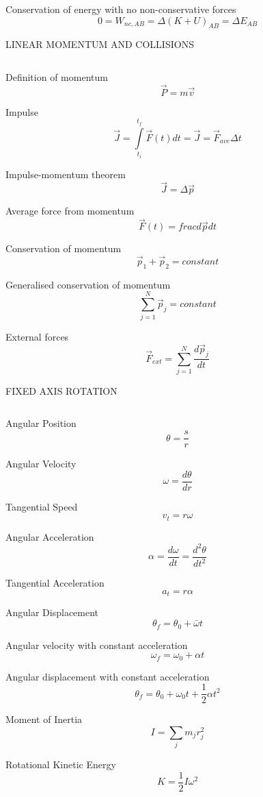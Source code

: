 \documentclass[12pt, letterpaper, twoside]{article}
\begin{document}
Conservation of energy with no non-conservative forces
$$ 0 = W_{nc,AB} = \Delta (K + U)_{AB} = \Delta E_{AB} $$



\newpage

LINEAR MOMENTUM AND COLLISIONS

$$ $$

Definition of momentum
$$ \overrightarrow{P} = m \overrightarrow{v} $$


Impulse
$$ \overrightarrow{J} = \int\limits_{t_i}^{t_f} \overrightarrow{F}(t) dt  = \overrightarrow{J} = \overrightarrow{F}_{ave} \Delta t $$


Impulse-momentum theorem
$$ \overrightarrow{J} = \Delta \overrightarrow{p}$$


Average force from momentum
$$ \overrightarrow{F} (t) = frac{d \overrightarrow{p}}{dt} $$


Conservation of momentum
$$  \overrightarrow{p}_1 +  \overrightarrow{p}_2 = constant $$


Generalised conservation of momentum
$$  \displaystyle\sum_{j=1}^{N} \overrightarrow{p}_j = constant $$



External forces
$$ \overrightarrow{F}_{ext} = \displaystyle\sum_{j=1}^{N} \frac{d \overrightarrow{p}_j}{dt} $$


\newpage



FIXED AXIS ROTATION

$$ $$


Angular Position
$$ \theta = \frac{s}{r} $$


Angular Velocity
$$ \omega = \frac{d \theta}{dr} $$


Tangential Speed
$$ v_t = r \omega $$

Angular Acceleration
$$ \alpha =\frac{d \omega}{dt} = \frac{d^2 \theta}{d t^2}$$


Tangential Acceleration
$$ a_t = r \alpha $$


Angular Displacement
$$ \theta_f = \theta_0 + \bar{\omega} t $$


Angular velocity with constant acceleration
$$ \omega_f = \omega_0 + \alpha t $$


Angular displacement with constant acceleration
$$ \theta_f = \theta_0 + \omega_0 t + \frac{1}{2} \alpha t^2 $$


Moment of Inertia
$$ I = \sum_j m_j r_j^2 $$


Rotational Kinetic Energy
$$ K = \frac{1}{2} I \omega^2 $$
\end{document}

